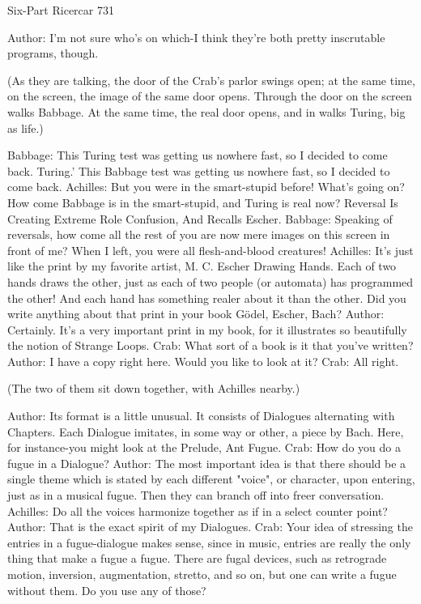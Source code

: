 Six-Part Ricercar                                                                         731

Author: I'm not sure who's on which-I think they're both pretty inscrutable programs,
  though.

   (As they are talking, the door of the Crab's parlor swings open; at the same time, on
   the screen, the image of the same door opens. Through the door on the screen walks
   Babbage. At the same time, the real door opens, and in walks Turing, big as life.)

Babbage: This Turing test was getting us nowhere fast, so I decided to come back.
Turing.' This Babbage test was getting us nowhere fast, so I decided to come back.
Achilles: But you were in the smart-stupid before! What's going on? How come Babbage
  is in the smart-stupid, and Turing is real now? Reversal Is Creating Extreme Role
  Confusion, And Recalls Escher.
Babbage: Speaking of reversals, how come all the rest of you are now mere images on
  this screen in front of me? When I left, you were all flesh-and-blood creatures!
Achilles: It's just like the print by my favorite artist, M. C. Escher Drawing Hands. Each
  of two hands draws the other, just as each of two people (or automata) has
  programmed the other! And each hand has something realer about it than the other.
  Did you write anything about that print in your book Gödel, Escher, Bach?
Author: Certainly. It's a very important print in my book, for it illustrates so beautifully
  the notion of Strange Loops.
Crab: What sort of a book is it that you've written?
Author: I have a copy right here. Would you like to look at it?
Crab: All right.

   (The two of them sit down together, with Achilles nearby.)

Author: Its format is a little unusual. It consists of Dialogues alternating with Chapters.
  Each Dialogue imitates, in some way or other, a piece by Bach. Here, for instance-you
  might look at the Prelude, Ant Fugue.
Crab: How do you do a fugue in a Dialogue?
Author: The most important idea is that there should be a single theme which is stated by
  each different "voice", or character, upon entering, just as in a musical fugue. Then
  they can branch off into freer conversation.
Achilles: Do all the voices harmonize together as if in a select counter point?
Author: That is the exact spirit of my Dialogues.
Crab: Your idea of stressing the entries in a fugue-dialogue makes sense, since in music,
  entries are really the only thing that make a fugue a fugue. There are fugal devices,
  such as retrograde motion, inversion, augmentation, stretto, and so on, but one can
  write a fugue without them. Do you use any of those?




